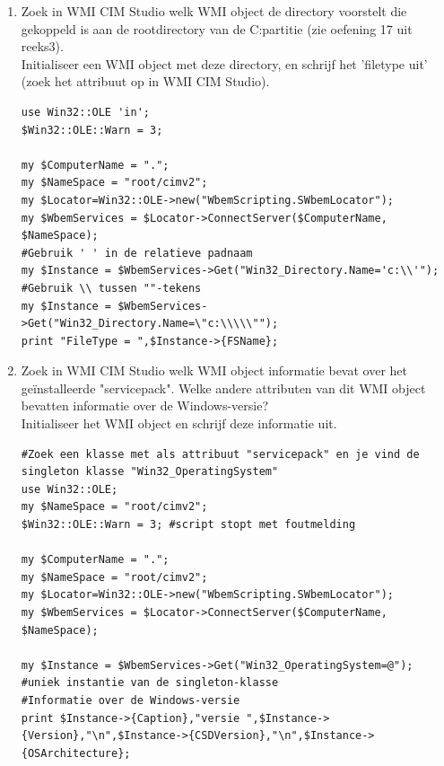 \documentclass[11pt,a4paper]{report}
\begin{document}
\begin{enumerate}[resume]
\begin{lstlisting}
#OF
my $Locator=Win32::OLE->new("WbemScripting.SWbemLocator");
my $WbemServices = $Locator->ConnectServer($ComputerName, $NameSpace);
my $Instance = $WbemServices->Get("$ClassName.DeviceID=\"$DeviceID\"");
#mogelijk alternatief met ''-tekens
#my $Instance = $WbemServices->Get("$ClassName.DeviceID='$DeviceID'");
print "\nObjecttype van de instantie=", join(" / ",Win32::OLE->QueryObjectType($Instance));
print "\nName= ",$Instance->{Name};
	\end{lstlisting}
	\newpage
	\item Zoek in WMI CIM Studio welk WMI object de directory voorstelt die gekoppeld is aan de rootdirectory van de C:partitie (zie oefening 17 uit reeks3).
	\\ Initialiseer een WMI object met deze directory, en schrijf het 'filetype uit' (zoek het attribuut op in WMI CIM Studio).
	\begin{lstlisting}
use Win32::OLE 'in';
$Win32::OLE::Warn = 3;

my $ComputerName = ".";
my $NameSpace = "root/cimv2";
my $Locator=Win32::OLE->new("WbemScripting.SWbemLocator");
my $WbemServices = $Locator->ConnectServer($ComputerName, $NameSpace);
#Gebruik ' ' in de relatieve padnaam
my $Instance = $WbemServices->Get("Win32_Directory.Name='c:\\'");
#Gebruik \\ tussen ""-tekens
my $Instance = $WbemServices->Get("Win32_Directory.Name=\"c:\\\\\"");
print "FileType = ",$Instance->{FSName};
	\end{lstlisting}
	\item Zoek in WMI CIM Studio welk WMI object informatie bevat over het geïnstalleerde "servicepack". Welke andere attributen van dit WMI object bevatten informatie over de Windows-versie?
	\\Initialiseer het WMI object en schrijf deze informatie uit.
	\begin{lstlisting}
#Zoek een klasse met als attribuut "servicepack" en je vind de singleton klasse "Win32_OperatingSystem"
use Win32::OLE;
my $NameSpace = "root/cimv2";
$Win32::OLE::Warn = 3; #script stopt met foutmelding

my $ComputerName = ".";
my $NameSpace = "root/cimv2";
my $Locator=Win32::OLE->new("WbemScripting.SWbemLocator");
my $WbemServices = $Locator->ConnectServer($ComputerName, $NameSpace);

my $Instance = $WbemServices->Get("Win32_OperatingSystem=@"); #uniek instantie van de singleton-klasse
#Informatie over de Windows-versie
print $Instance->{Caption},"versie ",$Instance->{Version},"\n",$Instance->{CSDVersion},"\n",$Instance->{OSArchitecture};
	\end{lstlisting}
\end{enumerate}
\end{document}
